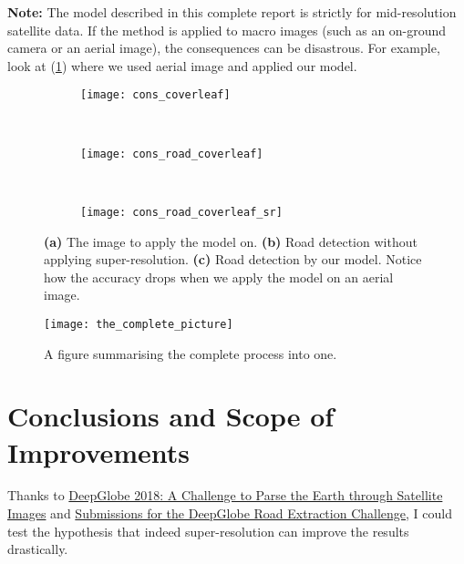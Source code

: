 \textbf{Note:} The model described in this complete report is strictly for mid-resolution satellite data. If the method is applied to macro images (such as an on-ground camera or an aerial image), the consequences can be disastrous. For example, look at (\cref{fig:cons_coverleaf}) where we used aerial image and applied our model.

\begin{figure}[h!]
  \centering
  \begin{subfigure}{0.3\textwidth}
    \texttt{[image: cons\_coverleaf]}
    \caption{}
  \end{subfigure}~
  \begin{subfigure}{0.3\textwidth}
    \texttt{[image: cons\_road\_coverleaf]}
    \caption{}
  \end{subfigure}~
  \begin{subfigure}{0.3\textwidth}
    \texttt{[image: cons\_road\_coverleaf\_sr]}
    \caption{}
  \end{subfigure}
  \caption[Disastors in applying the model on unexpected images]{\textbf{(a)} The image to apply the model on. \textbf{(b)} Road detection without applying super-resolution. \textbf{(c)} Road detection by our model. Notice how the accuracy drops when we apply the model on an aerial image.}
  \label{fig:cons_coverleaf}
\end{figure}

\begin{sidewaysfigure}
  \centering
  \texttt{[image: the\_complete\_picture]}
  \caption{A figure summarising the complete process into one.}
  \label{fig:the_complete_picture}
\end{sidewaysfigure}

\chapter{Conclusions and Scope of Improvements}

Thanks to \href{https://arxiv.org/pdf/1805.06561.pdf}{DeepGlobe 2018: A Challenge to Parse the Earth through Satellite Images} and \href{http://openaccess.thecvf.com/content_cvpr_2018_workshops/papers/w4/Zhou_D-LinkNet_LinkNet_With_CVPR_2018_paper.pdf}{Submissions for the DeepGlobe Road Extraction Challenge}, I could test the hypothesis that indeed super-resolution can improve the results drastically.

